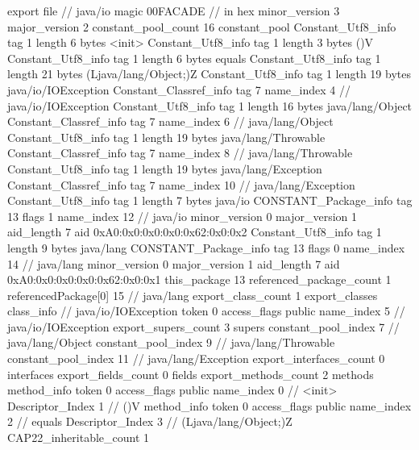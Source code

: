 export file {		// java/io
	magic	00FACADE		 // in hex
	minor_version	3
	major_version	2
	constant_pool_count	16
	constant_pool {
		Constant_Utf8_info {
			tag	1
			length	6
			bytes	<init>
		}
		Constant_Utf8_info {
			tag	1
			length	3
			bytes	()V
		}
		Constant_Utf8_info {
			tag	1
			length	6
			bytes	equals
		}
		Constant_Utf8_info {
			tag	1
			length	21
			bytes	(Ljava/lang/Object;)Z
		}
		Constant_Utf8_info {
			tag	1
			length	19
			bytes	java/io/IOException
		}
		Constant_Classref_info {
			tag	7
			name_index	4		// java/io/IOException
		}
		Constant_Utf8_info {
			tag	1
			length	16
			bytes	java/lang/Object
		}
		Constant_Classref_info {
			tag	7
			name_index	6		// java/lang/Object
		}
		Constant_Utf8_info {
			tag	1
			length	19
			bytes	java/lang/Throwable
		}
		Constant_Classref_info {
			tag	7
			name_index	8		// java/lang/Throwable
		}
		Constant_Utf8_info {
			tag	1
			length	19
			bytes	java/lang/Exception
		}
		Constant_Classref_info {
			tag	7
			name_index	10		// java/lang/Exception
		}
		Constant_Utf8_info {
			tag	1
			length	7
			bytes	java/io
		}
		CONSTANT_Package_info {
			tag	13
			flags	1
			name_index	12		// java/io
			minor_version	0
			major_version	1
			aid_length	7
			aid	0xA0:0x0:0x0:0x0:0x62:0x0:0x2
		}
		Constant_Utf8_info {
			tag	1
			length	9
			bytes	java/lang
		}
		CONSTANT_Package_info {
			tag	13
			flags	0
			name_index	14		// java/lang
			minor_version	0
			major_version	1
			aid_length	7
			aid	0xA0:0x0:0x0:0x0:0x62:0x0:0x1
		}
	}
	this_package	13
	referenced_package_count	1
	referencedPackage[0]	15		// java/lang
	export_class_count	1
	export_classes {
		class_info {		// java/io/IOException
			token	0
			access_flags	public
			name_index	5		// java/io/IOException
			export_supers_count	3
			supers {
				constant_pool_index	7		// java/lang/Object
				constant_pool_index	9		// java/lang/Throwable
				constant_pool_index	11		// java/lang/Exception
			}
			export_interfaces_count	0
			interfaces {
			}
			export_fields_count	0
			fields {
			}
			export_methods_count	2
			methods {
				method_info {
					token	0
					access_flags	public
					name_index	0		// <init>
					Descriptor_Index	1		// ()V
				}
				method_info {
					token	0
					access_flags	public
					name_index	2		// equals
					Descriptor_Index	3		// (Ljava/lang/Object;)Z
				}
			}
			CAP22_inheritable_count	1
		}
	}
}
